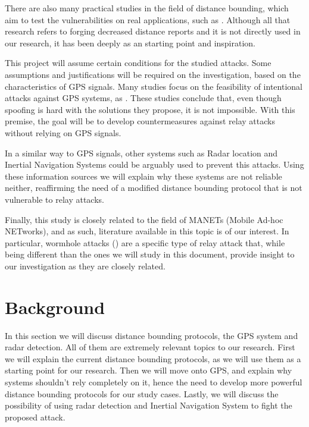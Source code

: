 \documentclass{article}
\begin{document}
There are also many practical studies in the field of distance bounding, which aim to test the vulnerabilities on real applications, such as \cite{francillon2011relay, francis2010practical, hancke2005practical, markantonakis2012practical, vandenbreekel2014relay}. Although all that research refers to forging decreased distance reports and it is not directly used in our research, it has been deeply as an starting point and inspiration.

This project will assume certain conditions for the studied attacks. Some assumptions and justifications will be required on the investigation, based on the characteristics of GPS signals. Many studies focus on the feasibility of intentional attacks against GPS systems, as \cite{warner2003gps, wen2005countermeasures, jafarnia2012gps}. These studies conclude that, even though spoofing is hard with the solutions they propose, it is not impossible. With this premise, the goal will be to develop countermeasures against relay attacks without relying on GPS signals.

In a similar way to GPS signals, other systems such as Radar location \cite{cadirci2009rf} and Inertial Navigation Systems \cite{patent:4085440} could be arguably used to prevent this attacks. Using these information sources we will explain why these systems are not reliable neither, reaffirming the need of a modified distance bounding protocol that is not vulnerable to relay attacks.

Finally, this study is closely related to the field of MANETs (Mobile Ad-hoc NETworks), and as such, literature available in this topic is of our interest. In particular, wormhole attacks (\cite{hu2006wormhole, maheshwari2007detecting, goyal2010literature}) are a specific type of relay attack that, while being different than the ones we will study in this document, provide insight to our investigation as they are closely related.








\section{Background}
\label{sec:background}

In this section we will discuss distance bounding protocols, the GPS system and radar detection. All of them are extremely relevant topics to our research. First we will explain the current distance bounding protocols, as we will use them as a starting point for our research. Then we will move onto GPS, and explain why systems shouldn't rely completely on it, hence the need to develop more powerful distance bounding protocols for our study cases. Lastly, we will discuss the possibility of using radar detection and Inertial Navigation System to fight the proposed attack.
\end{document}
